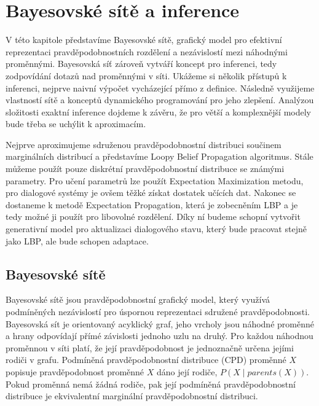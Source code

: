 \chapter{Bayesovské sítě a inference}

V této kapitole představíme Bayesovské sítě, grafický model pro efektivní reprezentaci pravděpodobnostních rozdělení a nezávislostí mezi náhodnými proměnnými.
Bayesovská síť zároveň vytváří koncept pro inferenci, tedy zodpovídání dotazů nad proměnnými v síti.
Ukážeme si několik přístupů k inferenci, nejprve naivní výpočet vycházející přímo z definice.
Následně využijeme vlastností sítě a konceptů dynamického programování pro jeho zlepšení.
Analýzou složitosti exaktní inference dojdeme k závěru, že pro větší a komplexnější modely bude třeba se uchýlit k aproximacím.

Nejprve aproximujeme sdruženou pravděpodobnostní distribuci součinem marginálních distribucí a představíme Loopy Belief Propagation algoritmus.
Stále můžeme použít pouze diskrétní pravděpodobnostní distribuce se známými parametry.
Pro učení parametrů lze použít Expectation Maximization metodu, pro dialogové systémy je ovšem těžké získat dostatek učících dat.
Nakonec se dostaneme k metodě Expectation Propagation, která je zobecněním LBP a je tedy možné ji použít pro libovolné rozdělení.
Díky ní budeme schopní vytvořit generativní model pro aktualizaci dialogového stavu, který bude pracovat stejně jako LBP, ale bude schopen adaptace.

\section{Bayesovské sítě}

Bayesovské sítě jsou pravděpodobnostní grafický model, který využívá podmíněných nezávislostí pro úspornou reprezentaci sdružené pravděpodobnosti.
Bayesovská sít je orientovaný acyklický graf, jeho vrcholy jsou náhodné proměnné a hrany odpovídají přímé závislosti jednoho uzlu na druhý.
Pro každou náhodnou proměnnou v síti platí, že její pravděpodobnost je jednoznačně určena jejími rodiči v grafu.
Podmíněná pravděpodobnostní distribuce (CPD) proměnné $X$ popisuje pravděpodobnost proměnné $X$ dáno její rodiče, $P(X \mid parents(X))$.
Pokud proměnná nemá žádná rodiče, pak její podmíněná pravděpodobnostní distribuce je ekvivalentní marginální pravděpodobnostní distribuci.

